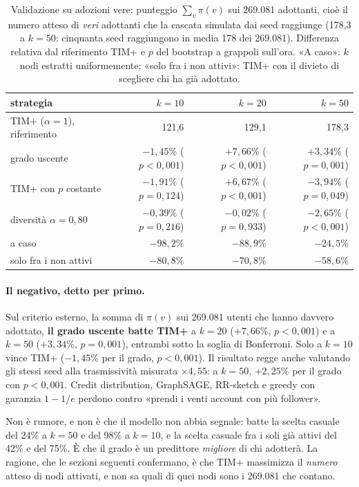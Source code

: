 \documentclass[11pt,a4paper]{article}
\begin{document}
\begin{table}[htbp]
  \centering\small
  \caption{Validazione su adozioni vere: punteggio $\sum_v\pi(v)$ sui 269.081 adottanti, cioè il numero atteso di \emph{veri} adottanti che la cascata simulata dai seed raggiunge (178,3 a $k=50$: cinquanta seed raggiungono in media 178 dei 269.081). Differenza relativa dal riferimento TIM+ e $p$ del bootstrap a grappoli sull'ora. «A caso»: $k$ nodi estratti uniformemente; «solo fra i non attivi»: TIM+ con il divieto di scegliere chi ha già adottato.}
  \label{tab:validazione}
  \begin{tabular}{lrrr}
    \toprule
    strategia & $k=10$ & $k=20$ & $k=50$ \\
    \midrule
    TIM+ ($\alpha=1$), riferimento & 121,6 & 129,1 & 178,3 \\
    grado uscente & $-1{,}45\%$ ($p<0{,}001$) & $+7{,}66\%$ ($p<0{,}001$) & $+3{,}34\%$ ($p=0{,}001$) \\
    TIM+ con $p$ costante & $-1{,}91\%$ ($p=0{,}124$) & $+6{,}67\%$ ($p<0{,}001$) & $-3{,}94\%$ ($p=0{,}049$) \\
    diversità $\alpha=0{,}80$ & $-0{,}39\%$ ($p=0{,}216$) & $-0{,}02\%$ ($p=0{,}933$) & $-2{,}65\%$ ($p<0{,}001$) \\
    a caso & $-98{,}2\%$ & $-88{,}9\%$ & $-24{,}5\%$ \\
    solo fra i non attivi & $-80{,}8\%$ & $-70{,}8\%$ & $-58{,}6\%$ \\
    \bottomrule
  \end{tabular}
\end{table}
\paragraph{Il negativo, detto per primo.} Sul criterio esterno, la somma di $\pi(v)$ sui 269.081 utenti che hanno davvero adottato, \textbf{il grado uscente batte TIM+} a $k = 20$ ($+7{,}66\%$, $p < 0{,}001$) e a $k = 50$ ($+3{,}34\%$, $p = 0{,}001$), entrambi sotto la soglia di Bonferroni. Solo a $k = 10$ vince TIM+ ($-1{,}45\%$ per il grado, $p < 0{,}001$). Il risultato regge anche valutando gli stessi seed alla trasmissività misurata $\times 4{,}55$: a $k = 50$, $+2{,}25\%$ per il grado con $p < 0{,}001$. Credit distribution, GraphSAGE, RR-sketch e greedy con garanzia $1 - 1/e$ perdono contro «prendi i venti account con più follower».

Non è rumore, e non è che il modello non abbia segnale: batte la scelta casuale del 24\% a $k = 50$ e del 98\% a $k = 10$, e la scelta casuale fra i soli già attivi del 42\% e del 75\%. È che il grado è un predittore \emph{migliore} di chi adotterà. La ragione, che le sezioni seguenti confermano, è che TIM+ massimizza il \emph{numero} atteso di nodi attivati, e non sa quali di quei nodi sono i 269.081 che contano.
\end{document}

